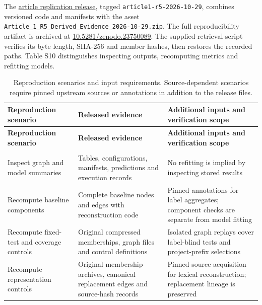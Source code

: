 \documentclass[preprint,12pt]{elsarticle}
\begin{document}
The \href{https://github.com/KuznetsovKarazin/blockchain-detector-eval/releases/tag/article1-r5-2026-10-29}{article replication release}, tagged \texttt{article1-r5-2026-10-29}, combines versioned code and manifests with the asset \nolinkurl{Article_1_R5_Derived_Evidence_2026-10-29.zip}. The full reproducibility artifact is archived at \href{https://doi.org/10.5281/zenodo.23750089}{10.5281/zenodo.23750089}. The supplied retrieval script verifies its byte length, SHA-256 and member hashes, then restores the recorded paths. Table S10 distinguishes inspecting outputs, recomputing metrics and refitting models.

\begingroup
\small
\setlength{\tabcolsep}{4pt}
\setlength{\LTcapwidth}{\linewidth}
\renewcommand{\arraystretch}{1.14}
\begin{longtable}{>{\raggedright\arraybackslash}p{}>{\raggedright\arraybackslash}p{}>{\raggedright\arraybackslash}p{}}
\caption{Reproduction scenarios and input requirements. Source-dependent scenarios require pinned upstream sources or annotations in addition to the release files.}\label{tab:S10}\\
\toprule
\textbf{Reproduction scenario} & \textbf{Released evidence} & \textbf{Additional inputs and verification scope} \\
\midrule
\endfirsthead
\toprule
\textbf{Reproduction scenario} & \textbf{Released evidence} & \textbf{Additional inputs and verification scope} \\
\midrule
\endhead
\midrule
\multicolumn{3}{r}{\footnotesize Continued on next page} \\
\endfoot
\bottomrule
\endlastfoot
Inspect graph and model summaries & Tables, configurations, manifests, predictions and execution records & No refitting is implied by inspecting stored results \\
Recompute baseline components & Complete baseline nodes and edges with reconstruction code & Pinned annotations for label aggregates; component checks are separate from model fitting \\
Recompute fixed-test and coverage controls & Original compressed memberships, graph files and control definitions & Isolated graph replays cover label-blind tests and project-prefix selections \\
Recompute representation controls & Original membership archives, canonical replacement edges and source-hash records & Pinned source acquisition for lexical reconstruction; replacement lineage is preserved \\

\end{longtable}
\end{document}
